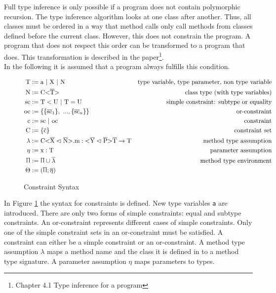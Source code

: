 Full type inference is only possible if a program does not contain polymorphic recursion.
The type inference algorithm looks at one class after another. Thus, all classes must be ordered in a way that method calls only call methods from classes defined before the current class.
However, this does not constrain the program. A program that does not respect this order can be transformed to a program that does.
This transformation is described in the paper\footnote{Chapter 4.1 Type inference for a program}.
\\
In the following it is assumed that a program always fulfills this condition.

\begin{figure}[tp]
    \begin{align*}
        \text{T} &:= \text{a} \ | \ \text{X} \ | \ \text{N} &\text{type variable, type parameter, non type variable} \\
        \text{N} &:= \text{C} \vv{\ot{T}} &\text{class type (with type variables)}\\
        \text{sc} &:= \text{T} < \text{U} \ | \ \text{T} = \text{U} &\text{simple constraint: subtype or equality}\\
        \text{oc} &:= \{ \{ \ot{sc}_1 \}, \ ..., \{ \ot{sc}_n \} \} &\text{or-constraint}\\
        \text{c} &:= \text{sc} \ | \ \text{oc} &\text{constraint}\\
        \text{C} &:= \{ \ot{c} \} &\text{constraint set}\\
        \lambda &:= \cm : \yp \oto{\text{T}} &\text{method type assumption}\\
        \eta &:= \text{x} : \text{T} &\text{parameter assumption}\\
        \sprod{0.7} &:= \sprod{0.7} \cup \overline{\lambda} &\text{method type environment}\\
        \Theta &:= ( \sprod{0.7}; \overline{\eta} )
    \end{align*}
    \caption{Constraint Syntax}
    \label{constraint_syntax}
\end{figure}

In Figure \ref{constraint_syntax} the syntax for constraints is defined. New type variables \verb|a| are introduced. There are only two forms of simple constraints: equal and subtype constraints. An or-constraint represents different cases of simple constraints. Only one of the simple constraint sets in an or-constraint must be satisfied.
A constraint can either be a simple constraint or an or-constraint. A method type assumption $\lambda$ maps a method name and the class it is defined in to a method type signature. A parameter assumption $\eta$ maps parameters to types.

